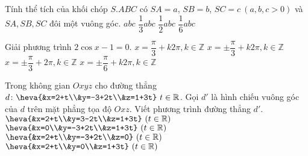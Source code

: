 \begin{ex}%
Tính thể tích của khối chóp $S.ABC$ có $SA=a$, $SB=b$, $SC=c ~ (a,b,c>0)$ và $SA,SB,SC$ đôi một vuông góc.
\choice
{$abc$}
{$\dfrac{1}{3}abc$}
{$\dfrac{1}{2}abc$}
{\True $\dfrac{1}{6}abc$}
\end{ex}

\begin{ex}%
Giải phương trình $2\cos x-1=0$.
\choice
{$x=\dfrac{\pi}{3}+k2\pi,k\in\mathbb{Z}$}
{\True $x=\pm\dfrac{\pi}{3}+k2\pi,k\in\mathbb{Z}$}
{$x=\pm\dfrac{\pi}{3}+2\pi,k\in\mathbb{Z}$}
{$x=\pm\dfrac{\pi}{6}+k2\pi,k\in\mathbb{Z}$}
\end{ex}

\begin{ex}%
Trong không gian $Oxyz$ cho đường thẳng $d\colon \heva{&x=2+t\\&y=-3+2t\\&z=1+3t} ~t\in\mathbb{R}$. Gọi $d'$ là hình chiếu vuông góc của $d$ trên mặt phẳng tọa độ $Oxz$. Viết phương trình đường thẳng $d'$.
\choice
{$\heva{&x=2+t\\&y=3-2t\\&z=1+3t}~(t\in\mathbb{R})$}
{$\heva{&x=0\\&y=-3+2t\\&z=1+3t}~(t\in\mathbb{R})$}
{$\heva{&x=2+t\\&y=-3+2t\\&z=0}~(t\in\mathbb{R})$}
{\True $\heva{&x=2+t\\&y=0\\&z=1+3t}~(t\in\mathbb{R})$}
\end{ex}

